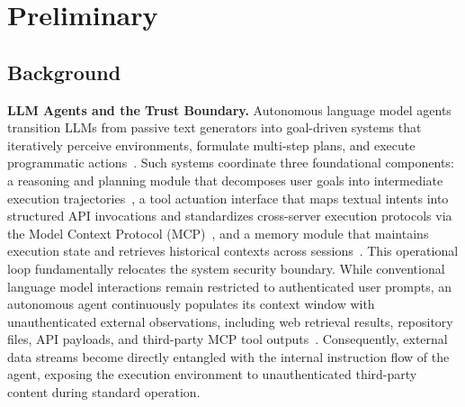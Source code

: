 \section{Preliminary}
\label{sec:preliminary}

\subsection{Background}
\label{sec:background}

\noindent
\textbf{LLM Agents and the Trust Boundary.} Autonomous language model
agents transition LLMs from passive text generators into goal-driven
systems that iteratively perceive environments, formulate multi-step
plans, and execute programmatic
actions~\cite{react,agentbench,swebench}. Such systems coordinate
three foundational components: a reasoning and planning module that
decomposes user goals into intermediate execution
trajectories~\cite{react}, a tool actuation interface that maps
textual intents into structured API invocations and standardizes
cross-server execution protocols via the Model Context Protocol
(MCP)~\cite{toolformer,mcp,autogen}, and a memory module that
maintains execution state and retrieves historical contexts across
sessions~\cite{memgpt}. This operational loop fundamentally relocates
the system security boundary. While conventional language model
interactions remain restricted to authenticated user prompts, an
autonomous agent continuously populates its context window with
unauthenticated external observations, including web retrieval
results, repository files, API payloads, and third-party MCP tool
outputs~\cite{mcpsafetyaudit,mcpfirstglance}. Consequently, external
data streams become directly entangled with the internal instruction
flow of the agent, exposing the execution environment to
unauthenticated third-party content during standard operation.

